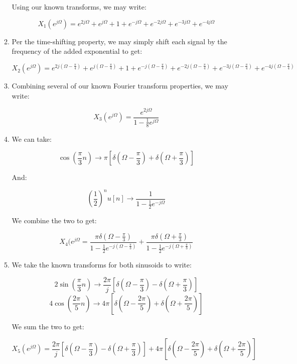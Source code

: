 \begin{enumerate}
\begin{enumerate}
        Using our known transforms, we may write:

        $$\boxed{X_1(e^{j\Omega})=e^{2j\Omega}+e^{j\Omega}+1+e^{-j\Omega}+e^{-2j\Omega}+e^{-3j\Omega}+e^{-4j\Omega}}$$

      \item Per the time-shifting property, we may simply shift each signal by the frequency of the added exponential to get:

        $$\boxed{X_2(e^{j\Omega})=e^{2j\left(\Omega-\frac{\pi}{4}\right)}+e^{j\left(\Omega-\frac{\pi}{4}\right)}+1+e^{-j\left(\Omega-\frac{\pi}{4}\right)}+e^{-2j\left(\Omega-\frac{\pi}{4}\right)}+e^{-3j\left(\Omega-\frac{\pi}{4}\right)}+e^{-4j\left(\Omega-\frac{\pi}{4}\right)}}$$

      \item Combining several of our known Fourier transform properties, we may write:

        $$\boxed{X_3(e^{j\Omega})=\frac{e^{2j\Omega}}{1-\frac{1}{8}e^{j\Omega}}}$$

      \item We can take:

        $$\cos\left( \frac{\pi}{3}n \right)\to \pi\left[ \delta\left( \Omega-\frac{\pi}{3} \right)+\delta\left( \Omega+\frac{\pi}{3} \right) \right]$$

        And:

        $$\left( \frac{1}{2} \right)^nu[n]\to\frac{1}{1-\frac{1}{2}e^{-j\Omega}}$$

        We combine the two to get:

        $$\boxed{X_4(e^{j\Omega}=\frac{\pi\delta\left( \Omega-\frac{\pi}{3} \right)}{1-\frac{1}{2}e^{-j\left( \Omega-\frac{\pi}{3} \right)}}+\frac{\pi\delta\left( \Omega+\frac{\pi}{3} \right)}{1-\frac{1}{2}e^{-j\left( \Omega+\frac{\pi}{3} \right)}}}$$

      \item We take the known transforms for both sinusoids to write:

        $$2\sin\left( \frac{\pi}{3}n \right)\to \frac{2\pi}{j}\left[ \delta\left( \Omega-\frac{\pi}{3} \right)-\delta\left( \Omega+\frac{\pi}{3} \right) \right]$$
        $$4\cos\left( \frac{2\pi}{5}n \right)\to 4\pi\left[ \delta\left( \Omega-\frac{2\pi}{5} \right)+\delta\left( \Omega+\frac{2\pi}{5} \right) \right]$$

        We sum the two to get:

        $$\boxed{X_5(e^{j\Omega})=\frac{2\pi}{j}\left[ \delta\left( \Omega-\frac{\pi}{3} \right)-\delta\left( \Omega+\frac{\pi}{3} \right) \right]+4\pi\left[ \delta\left( \Omega-\frac{2\pi}{5} \right)+\delta\left( \Omega+\frac{2\pi}{5} \right) \right]}$$


\end{enumerate}
\end{enumerate}
